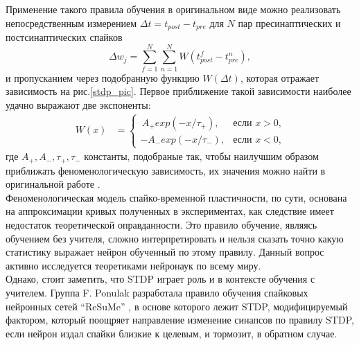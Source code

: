 \documentclass[a4paper,10pt]{article}
\begin{document}
\indent Применение такого правила обучения в оригинальном виде можно реализовать непосредственным измерением $\Delta t = t_{post}-t_{pre}$ для $N$ пар пресинаптических и постсинаптических спайков
\begin{equation*}\label{eq:sum_stdp}
\Delta w_{j} = \sum_{f=1}^N \sum_{n=1}^{N} W(t_{post}^{f} - t_{pre}^{n}),
\end{equation*}
 и пропусканием через подобранную функцию $W(\Delta t)$, которая отражает зависимость на рис.\ref{stdp_pic}. Первое приближение такой зависимости наиболее удачно выражают две экспоненты:
\begin{equation*}
\begin{split}
W(x) &=\begin{cases} \, A_{+} exp(-x/\tau_{+}), & \mbox{если }x>0\mbox{,} \\ -A_{-} exp(-x/\tau_{-}), & \mbox{если }x<0\mbox{,} \end{cases}
\end{split}
\end{equation*}
где $A_{+},A_{-},\tau_{+}, \tau_{-}$ константы, подобраные так, чтобы наилучшим образом приближать феноменологическую зависимость, их значения можно найти в оригинальной работе \cite{SongStdp}.\\
\indent Феноменологическая модель спайко-временной пластичности, по сути, основана на аппроксимации кривых полученных в экспериментах, как следствие имеет недостаток теоретической оправданности. Это правило обучение, являясь обучением без учителя, сложно интерпретировать и нельзя сказать точно какую статистику выражает нейрон обученный по этому правилу. Данный вопрос активно исследуется теоретиками нейронаук по всему миру.\\
\indent Однако, стоит заметить, что STDP играет роль и в контексте обучения с учителем. Группа F. Ponulak разработала правило обучения спайковых нейронных сетей ``ReSuMe'' \cite{ponulak2010supervised}, в основе которого лежит STDP, модифицируемый фактором, который поощряет направление изменение синапсов по правилу STDP, если нейрон издал спайки близкие к целевым, и тормозит, в обратном случае.\\   
\end{document}
